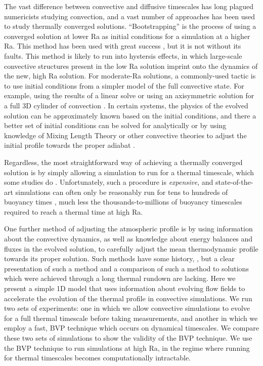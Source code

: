 \documentclass[aps, pre, onecolumn, nofootinbib, notitlepage, groupedaddress, amsfonts, amssymb, amsmath, longbibliography]{revtex4-1}
\begin{document}
The vast difference between convective and diffusive timescales has long plagued
numericists studying convection, and a vast number of approaches has been used to
study thermally converged solutions. ``Bootstrapping'' is the process of using
a converged solution at lower Ra as initial conditions for a simulation at a higher
Ra.  This method has been used with great success \cite{johnston&doering2009, verzicco&camussi1997},
but it is not without its faults.  This method is likely to run into hystersis
effects, in which large-scale convective structures present in the
low Ra solution imprint onto the dynamics of the new, high Ra solution. 
For moderate-Ra solutions, a commonly-used tactic is to use initial conditions from
a simpler model of the full convective state.  For example, using the results of
a linear solve \cite{hurlburt&all1984} or using an axisymmetric solution for a full
3D cylinder of convection \cite{verzicco&camussi1997}. In certain systems, 
the physics of the evolved solution can be approximately known based on the initial
conditions, and there a better set of initial conditions can be solved for analytically
\cite{couston&all2017} or by using knowledge of Mixing Length Theory or other convective
theories to adjust the initial profile towards the proper adiabat \cite{brandenburg&all2005}.

Regardless, the most straightforward way of achieving a thermally converged solution
is by simply allowing a simulation to run for a thermal timescale, which some
studies do \cite{featherstone&hindman2016}.  Unfortunately, such a procedure is
\emph{expensive}, and state-of-the-art simulations can often only be reasonably run
for tens to hundreds of buoyancy times \cite{stevens&all2011}, much less the
thousands-to-millions of buoyancy timescales required to reach a thermal time
at high Ra.

One further method of adjusting the atmospheric profile is by using information about
the convective dynamics, as well as knowledge about energy balances and fluxes in
the evolved solution, to carefully adjust the mean thermodynamic profile towards
its proper solution.  Such methods have some history, \cite{hurlburt&all1986}, but
a clear presentation of such a method and a comparison of such a method to solutions
which were achieved through a long thermal rundown are lacking.
Here we present a simple 1D model that uses information about evolving flow fields
to accelerate the evolution of the thermal profile in convective simulations.
We run two sets of experiments: one in which we allow convective simulations to evolve for a
full thermal timescale before taking measurements, and another in which we employ a fast,
BVP technique which occurs on dynamical timescales. We compare these two sets of simulations to
show the validity of the BVP technique.  We use the BVP technique to run simulations
at high Ra, in the regime where running for thermal timescales becomes computationally intractable.
\end{document}
